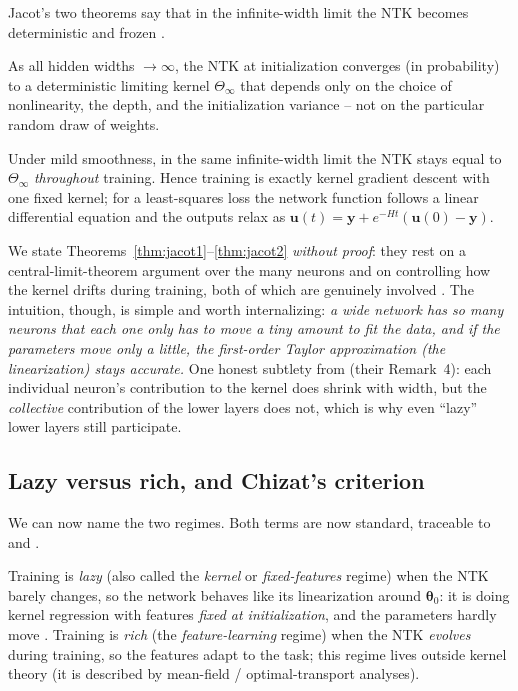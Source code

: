 Jacot's two theorems say that in the infinite-width limit the NTK becomes
deterministic and frozen \citep{jacot2018}.

\begin{theorem}
\label{thm:jacot1}
As all hidden widths $\to\infty$, the NTK at initialization converges (in
probability) to a deterministic limiting kernel $\Theta_\infty$ that
depends only on the choice of nonlinearity, the depth, and the
initialization variance -- not on the particular random draw of weights.
\end{theorem}

\begin{theorem}
\label{thm:jacot2}
Under mild smoothness, in the same infinite-width limit the NTK stays equal
to $\Theta_\infty$ \emph{throughout} training. Hence training is exactly
kernel gradient descent with one fixed kernel; for a least-squares loss the
network function follows a linear differential equation and the outputs
relax as $\mathbf{u}(t) = \mathbf{y} + e^{-H t}(\mathbf{u}(0)-\mathbf{y})$.
\end{theorem}

We state Theorems~\ref{thm:jacot1}--\ref{thm:jacot2} \emph{without proof}:
they rest on a central-limit-theorem argument over the many neurons and on
controlling how the kernel drifts during training, both of which are
genuinely involved \citep{jacot2018}. The intuition, though, is simple and
worth internalizing: \emph{a wide network has so many neurons that each one
only has to move a tiny amount to fit the data, and if the parameters move
only a little, the first-order Taylor approximation (the linearization)
stays accurate.} One honest subtlety from \citet{jacot2018} (their
Remark~4): each individual neuron's contribution to the kernel does shrink
with width, but the \emph{collective} contribution of the lower layers does
not, which is why even ``lazy'' lower layers still participate.

\subsection{Lazy versus rich, and Chizat's criterion}

We can now name the two regimes. Both terms are now standard, traceable to
\citet{jacot2018} and \citet{chizat2019}.

\begin{definition}
Training is \emph{lazy} (also called the \emph{kernel} or
\emph{fixed-features} regime) when the NTK barely changes, so the network
behaves like its linearization around $\boldsymbol\theta_0$: it is doing
kernel regression with features \emph{fixed at initialization}, and the
parameters hardly move \citep{chizat2019}. Training is \emph{rich} (the
\emph{feature-learning} regime) when the NTK \emph{evolves} during
training, so the features adapt to the task; this regime lives outside
kernel theory (it is described by mean-field / optimal-transport analyses).
\end{definition}

